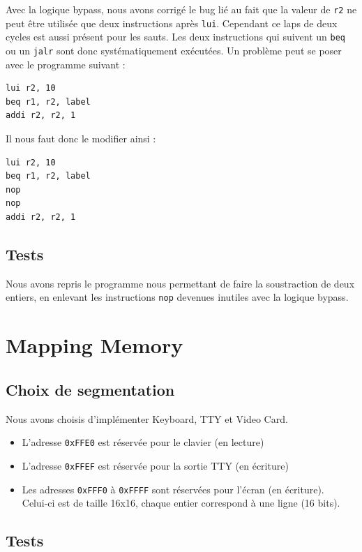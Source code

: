 \documentclass[a4paper]{article}
\begin{document}
  Avec la logique bypass, nous avons corrigé le bug lié au fait que la valeur de \verb|r2| ne peut être utilisée que deux instructions après \verb|lui|. Cependant ce laps de deux cycles est aussi présent pour les sauts. Les deux instructions qui suivent un \verb|beq| ou un \verb|jalr| sont donc systématiquement exécutées. Un problème peut se poser avec le programme suivant :
\begin{verbatim}
lui r2, 10
beq r1, r2, label
addi r2, r2, 1
\end{verbatim}
  Il nous faut donc le modifier ainsi :
\begin{verbatim}
lui r2, 10
beq r1, r2, label
nop
nop
addi r2, r2, 1
\end{verbatim}

  \subsection{Tests}
  Nous avons repris le programme nous permettant de faire la soustraction de deux entiers, en enlevant les instructions \verb|nop| devenues inutiles avec la logique bypass.

  \section{Mapping Memory}
  
  \subsection{Choix de segmentation}
  
  Nous avons choisis d'implémenter Keyboard, TTY et Video Card.
  \begin{itemize}
  \item L'adresse \verb|0xFFE0| est réservée pour le clavier (en lecture)
  \item L'adresse \verb|0xFFEF| est réservée pour la sortie TTY (en écriture)
  \item Les adresses \verb|0xFFF0| à \verb|0xFFFF| sont réservées pour l'écran (en écriture).\\ Celui-ci est de taille 16x16, chaque entier correspond à une ligne (16 bits).
  \end{itemize}
  
  \subsection{Tests}
  
\end{document}
